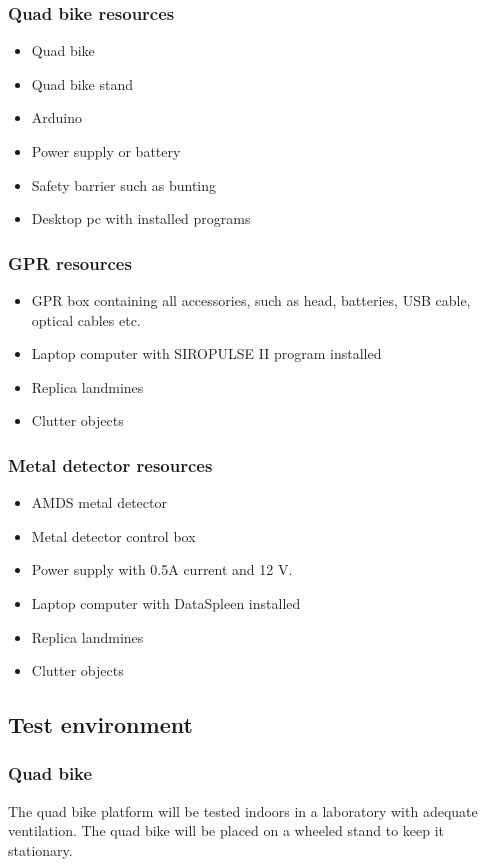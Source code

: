 \documentclass[main.tex]{subfiles}
\begin{document}
\begin{appendices}
\subsubsection{Quad bike resources}
\begin{itemize}
\item Quad bike
\item Quad bike stand
\item Arduino
\item Power supply or battery
\item Safety barrier such as bunting
\item Desktop pc with installed programs
\end{itemize} 

\subsubsection{GPR resources}
\begin{itemize}
\item GPR box containing all accessories, such as head, batteries, USB cable, optical cables etc. 
\item Laptop computer with SIROPULSE II program installed
\item Replica landmines
\item Clutter objects

\end{itemize} 

\subsubsection{Metal detector resources}
\begin{itemize}
\item AMDS metal detector
\item Metal detector control box
\item Power supply with 0.5A current and 12 V. 
\item Laptop computer with DataSpleen installed
\item Replica landmines
\item Clutter objects

\end{itemize} 

\subsection{Test environment}
\subsubsection{Quad bike}
The quad bike platform will be tested indoors in a laboratory with adequate ventilation. The quad bike will be placed on a wheeled stand to keep it stationary. 


\end{appendices}
\end{document}
